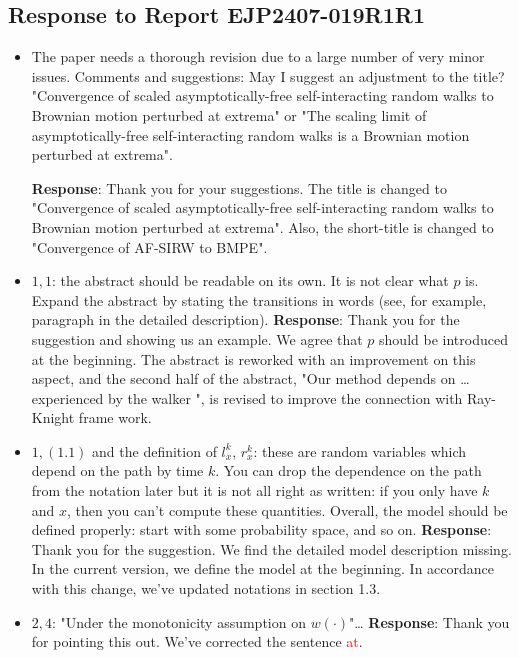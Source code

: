 \documentclass[11pt,a4paper]{article}
\numberwithin{equation}{section}
\def\TBF#1{\textcolor{red}{#1}} %
\begin{document}
	
	
	\newpage
	\subsection*{Response to Report EJP2407-019R1R1}
	\begin{itemize}
		\item The paper needs a thorough revision due to a large number of very minor issues.
		Comments and suggestions: May I suggest an adjustment to the title? "Convergence of scaled
		asymptotically-free self-interacting random walks to Brownian motion perturbed at extrema" or "The scaling limit of asymptotically-free self-interacting random walks is a Brownian motion perturbed at
		extrema".
		
		\subitem \textbf{Response}:  Thank you for your suggestions. The title is changed to "Convergence of scaled asymptotically-free
		self-interacting random walks to Brownian motion
		perturbed at extrema". Also, the short-title is changed to "Convergence of AF-SIRW to BMPE". 
		
		\item 
		$1,1$: the abstract should be readable on its own. It is not clear what $p$ is. Expand the abstract by stating the transitions in words (see, for example, paragraph in the detailed description).
		\subitem \textbf{Response}: Thank you for the suggestion and showing us an example. We agree that $p$ should be introduced at the beginning. The abstract is reworked with an improvement on this aspect, and the second half of the abstract, "Our method depends on \dots experienced by the walker ", is revised to improve the connection with Ray-Knight frame work. 
		
		\item 
		$1,(1.1)$ and the definition of $l_x^k$, $r_x^k$: these are random variables which depend on the path by time $k$. You can drop the dependence on the path from the notation later but it is not all right as written:	if you only have $k$ and $x$, then you can't compute these quantities. Overall, the model should be defined properly: start with some probability space, and so on.
		\subitem \textbf{Response}: Thank you for the suggestion. We find the detailed model description missing. In the current version, we define the model at the beginning. In accordance with this change, we've updated notations in section 1.3.
		
		\item 
		$2,4$: "Under the monotonicity assumption on $w(\cdot)$"\dots
		\subitem \textbf{Response}: Thank you for pointing this out.  We've corrected the sentence \TBF{at}. 
		

\end{itemize}
\end{document}

